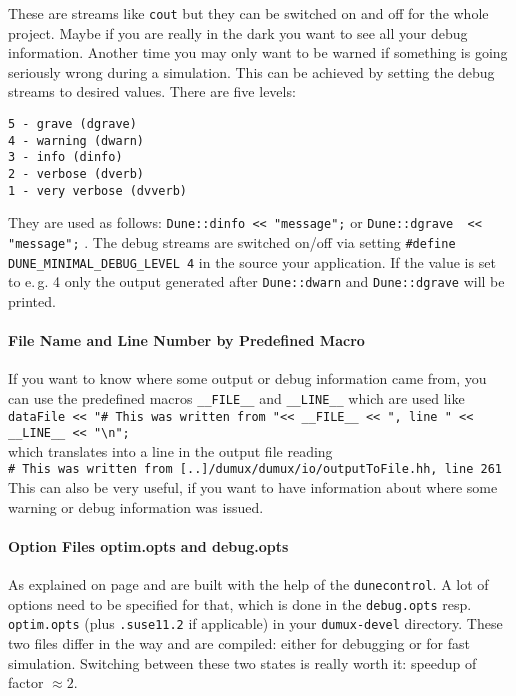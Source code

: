   These are streams like \texttt{cout} but they can be switched on and off for the whole project. 
  Maybe if you are really in the  dark you want to see all your debug information. Another time you may only want to be warned if something is going seriously wrong during a simulation. 
  This can be achieved by setting the debug streams to desired values. There are five levels:
\begin{verbatim}
5 - grave (dgrave)
4 - warning (dwarn)
3 - info (dinfo)
2 - verbose (dverb)
1 - very verbose (dvverb)
\end{verbatim}

They are used as follows: \lstinline{Dune::dinfo << "message";} or \lstinline{Dune::dgrave  << "message";} .
The debug streams are switched on/off via  setting \lstinline{#define DUNE_MINIMAL_DEBUG_LEVEL 4}
in the source your application. If the value is set to e.\,g. 4 only the output generated after
\lstinline{Dune::dwarn} and \lstinline{Dune::dgrave} will be printed.


\paragraph{File Name and Line Number by Predefined Macro}
If you want to  know where some output or debug information came from, you can use the predefined macros \lstinline{__FILE__} and \lstinline{__LINE__}
which are used like\\
\lstinline{dataFile << "# This was written from "<< __FILE__ << ", line " << __LINE__ << "\n";}\\
which translates into a line in the output file reading\\
\lstinline{# This was written from [..]/dumux/dumux/io/outputToFile.hh, line 261}\\
This can also be very useful, if you want to have information about where some warning or debug information was issued. 

\paragraph{Option Files optim.opts and debug.opts}
As explained on page \pageref{buildIt} \Dune and \Dumux are built with the help of the \texttt{dunecontrol}. 
A lot of options need to be specified for that, which is done in the \texttt{debug.opts} resp. \texttt{optim.opts}
(plus \texttt{.suse11.2} if applicable) in your \texttt{dumux-devel} directory. These two files differ in the way \Dune and \Dumux are compiled: either for debugging or for fast simulation. Switching between these two states is really 
worth it: speedup of factor $\approx 2$. 

